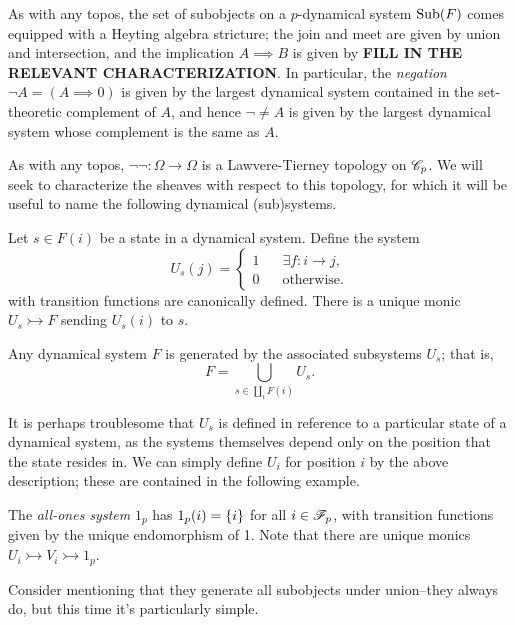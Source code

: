 \documentclass{amsart}
\begin{document}
As with any topos, the set of subobjects on a $p$-dynamical system $\operatorname{Sub}(F)$ comes equipped with a Heyting algebra stricture;
the join and meet are given by union and intersection, and the implication $A \implies B$ is given by \textbf{FILL IN THE RELEVANT CHARACTERIZATION}.
In particular, the \emph{negation} $\neg A = (A \implies 0)$ is given by the largest dynamical system contained in the set-theoretic complement of $A$, and hence $\neg \neq A$ is given by the largest dynamical system whose complement is the same as $A$.

As with any topos, $\neg \neg:\Omega \rightarrow \Omega$ is a Lawvere-Tierney topology on $\mathscr{C}_p$.
We will seek to characterize the sheaves with respect to this topology, for which it will be useful to name the following dynamical (sub)systems.

\begin{example}
  Let $s \in F(i)$ be a state in a dynamical system.
  Define the system
  \[
    U_{s}(j) = \begin{cases}
      1 & \;\;\; \exists f:i \rightarrow j,\\
      0 & \;\;\; \text{otherwise.} 
    \end{cases}
  \]
  with transition functions are canonically defined.
  There is a unique monic $U_s \rightarrowtail F$ sending $U_{s}(i)$ to $s$.
  \begin{lemma}
    Any dynamical system $F$ is generated by the associated subsystems $U_{s}$;
    that is, 
    \[
      F = \bigcup_{s \in \coprod_i F(i)} U_{s}.
    \]
  \end{lemma}
\end{example}

It is perhaps troublesome that $U_s$ is defined in reference to a particular state of a dynamical system, as the systems themselves depend only on the position that the state resides in.
We can simply define $U_i$ for position $i$ by the above description;
these are contained in the following example.
\begin{example}
  The \emph{all-ones system} $1_p$ has $1_p(i) = \left\{ i \right\}$ for all $i \in \mathscr{F}_p$, with transition functions given by the unique endomorphism of 1.
  Note that there are unique monics $U_i \rightarrowtail V_i \rightarrowtail 1_p$.
  
  {\color{magenta} Consider mentioning that they generate all subobjects under union--they always do, but this time it's particularly simple.}
\end{example}
\end{document}

